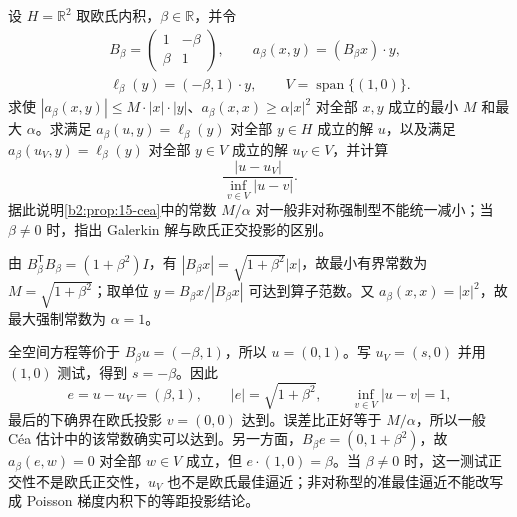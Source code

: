 \begin{exercise}\label{b2:ex:15-cea}
设 \(H=\mathbb R^2\) 取欧氏内积，\(\beta\in\mathbb R\)，并令
\[
 \begin{gathered}
 B_\beta=\begin{pmatrix}1&-\beta\\\beta&1\end{pmatrix},\qquad
 a_\beta(x,y)=(B_\beta x)\cdot y,\\
 \ell_\beta(y)=(-\beta,1)\cdot y,\qquad
 V=\operatorname{span}\{(1,0)\}.
 \end{gathered}
\]
求使 \(|a_\beta(x,y)|\le M\cdot|x|\cdot|y|\)、\(a_\beta(x,x)\ge\alpha|x|^2\) 对全部 \(x,y\) 成立的最小 \(M\) 和最大 \(\alpha\)。求满足 \(a_\beta(u,y)=\ell_\beta(y)\) 对全部 \(y\in H\) 成立的解 \(u\)，以及满足 \(a_\beta(u_V,y)=\ell_\beta(y)\) 对全部 \(y\in V\) 成立的解 \(u_V\in V\)，并计算
\[
 \frac{|u-u_V|}{\inf_{v\in V}|u-v|}.
\]
据此说明\cref{b2:prop:15-cea}中的常数 \(M/\alpha\) 对一般非对称强制型不能统一减小；当 \(\beta\ne0\) 时，指出 Galerkin 解与欧氏正交投影的区别。
\end{exercise}
\begin{solution}
由 \(B_\beta^{\mathsf T}B_\beta=(1+\beta^2)I\)，有 \(|B_\beta x|=\sqrt{1+\beta^2}|x|\)，故最小有界常数为 \(M=\sqrt{1+\beta^2}\)；取单位 \(y=B_\beta x/|B_\beta x|\) 可达到算子范数。又 \(a_\beta(x,x)=|x|^2\)，故最大强制常数为 \(\alpha=1\)。

全空间方程等价于 \(B_\beta u=(-\beta,1)\)，所以 \(u=(0,1)\)。写 \(u_V=(s,0)\) 并用 \((1,0)\) 测试，得到 \(s=-\beta\)。因此
\[
 e=u-u_V=(\beta,1),\qquad |e|=\sqrt{1+\beta^2},\qquad
 \inf_{v\in V}|u-v|=1,
\]
最后的下确界在欧氏投影 \(v=(0,0)\) 达到。误差比正好等于 \(M/\alpha\)，所以一般 Céa 估计中的该常数确实可以达到。另一方面，\(B_\beta e=(0,1+\beta^2)\)，故 \(a_\beta(e,w)=0\) 对全部 \(w\in V\) 成立，但 \(e\cdot(1,0)=\beta\)。当 \(\beta\ne0\) 时，这一测试正交性不是欧氏正交性，\(u_V\) 也不是欧氏最佳逼近；非对称型的准最佳逼近不能改写成 Poisson 梯度内积下的等距投影结论。
\end{solution}

